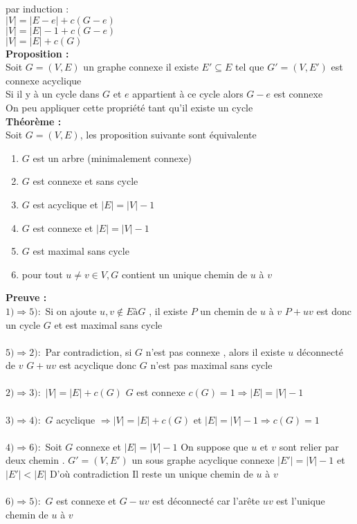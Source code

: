 \documentclass{report}
\newcommand{\preuve}{\textcolor[rgb]{0.95,0.25,0}{Preuve : }}
\newcommand{\Preuve}{\textbf{\preuve}}
\newcommand{\propo}{\textcolor[rgb]{0,0,0.75}{Proposition : }}
\newcommand{\Propo}{\textbf{\propo}}
\newcommand{\thm}{\textcolor[rgb]{0,0.4,1}{Théorème : }}
\newcommand{\THM}{\textbf{\thm}}
\begin{document}
par induction :\\
$\left|V\right|=\left|E-e\right|+c(G-e)$\\
$\left|V\right|=\left|E\right|-1+c(G-e)$\\
$\left|V\right|=\left|E\right|+c(G)$\\

\Propo\\
Soit $G=(V,E)$ un graphe connexe il existe $E'\subseteq E$  tel que $G'=(V,E')$ est connexe acyclique\\
Si il y à un cycle dans $G$ et $e$ appartient à ce cycle alors $G-e$ est connexe\\
On peu appliquer cette propriété tant qu'il existe un cycle\\
\newpage
\THM\\
Soit $G=(V,E)$, les proposition suivante sont équivalente\\
\begin{enumerate}
	\item $G$ est un arbre (minimalement connexe)
	\item $G$ est connexe et sans cycle
	\item $G$ est acyclique et $\left|E\right|=\left|V\right|-1$
	\item $G$ est connexe et $\left|E\right|=\left|V\right|-1$
	\item $G$ est maximal sans cycle
	\item pour tout $u\neq v \in V,G$ contient un unique chemin de $u$ à $v$\\
\end{enumerate}

\Preuve\\
\textbf{$1)\Rightarrow5) :$} Si on  ajoute $u,v \notin E à G$ , il existe $P$ un chemin de $u$ à $v$ $P+uv$ est donc un cycle $G$ et est maximal sans cycle\\
\\\textbf{$5)\Rightarrow2) :$} Par contradiction, si $G$ n'est pas connexe , alors il existe $u$ déconnecté de $v$ $G+uv$ est acyclique donc $G$ n'est pas maximal sans cycle\\
\\\textbf{$2)\Rightarrow3) :$} $\left|V\right|=\left|E\right|+c(G)$ $G$ est connexe $c(G)=1 \Longrightarrow \left|E\right|=\left|V\right|-1$\\
\\\textbf{$3)\Rightarrow4) :$} $G$ acyclique $\Rightarrow \left|V\right|=\left|E\right|+c(G)$ et $\left|E\right|=\left|V\right|-1 \Rightarrow c(G)=1$\\
\\\textbf{$4)\Rightarrow6) :$} Soit $G$ connexe et $\left|E\right|=\left|V\right|-1$ On suppose que $u$ et $v$ sont relier par deux chemin . $G'=(V,E')$ un sous graphe acyclique connexe $\left|E'\right|=\left|V\right|-1$ et $\left|E'\right|<\left|E\right|$ D'où contradiction Il reste un unique chemin de $u$ à $v$\\
\\\textbf{$6)\Rightarrow5) :$}	$G$ est connexe et $G-uv$ est déconnecté car l'arête $uv$ est l'unique chemin de $u$ à $v$\\
\end{document}
